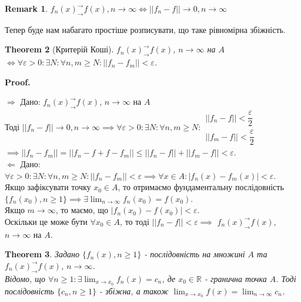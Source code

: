 \documentclass[a4paper, 10pt]{article}
\makeatletter
\def\huge{\displaystyle}
\def\qed{$\blacksquare$}
\def\rightproof{$\boxed{\Rightarrow}$ }
\def\leftproof{$\boxed{\Leftarrow}$ }
\theoremstyle{theoremdd}
\newtheorem{theorem}{Theorem}[subsection]
\theoremstyle{theoremdd}
\theoremstyle{theoremdd}
\theoremstyle{theoremdd}
\theoremstyle{theoremdd}
\theoremstyle{theoremdd}
\theoremstyle{theoremdd}
\newtheorem{remark}[theorem]{Remark}
\theoremstyle{theoremdd}
\theoremstyle{theoremdd}
\renewenvironment{proof}[1][Proof.\\]{\par
\pushQED{\hfill \qed}%
\normalfont \topsep6\p@\@plus6\p@\relax
\trivlist
\item\relax
{\bfseries
#1\@addpunct{.}}\hspace\labelsep\ignorespaces
}{%
\popQED\endtrivlist\@endpefalse
}
\makeatother
\begin{document}
\begin{remark}
$f_n(x)^\rightarrow_\rightarrow f(x), n \to \infty \iff ||f_n - f|| \to 0, n \to \infty$
\end{remark}
Тепер буде нам набагато простіше розписувати, що таке рівномірна збіжність.

\begin{theorem}[Критерій Коші]
$f_n(x)^\rightarrow_\rightarrow f(x)$, $n \to \infty$ на $A$ $\iff \forall \varepsilon > 0: \exists N: \forall n,m \geq N: ||f_n - f_m|| < \varepsilon$.
\end{theorem}

\begin{proof}
\rightproof Дано: $f_n(x)^\rightarrow_\rightarrow f(x)$, $n \to \infty$ на $A$\\
Тоді $||f_n - f|| \to 0, n \to \infty \implies \forall \varepsilon > 0: \exists N: \forall n,m \geq N: \begin{gathered} ||f_n-f|| < \dfrac{\varepsilon}{2} \\ ||f_m-f|| < \dfrac{\varepsilon}{2} \end{gathered}$\\
$\implies ||f_n - f_m|| = ||f_n - f + f - f_m|| \leq ||f_n - f|| + ||f_m - f|| < \varepsilon$.
\bigskip \\
\leftproof Дано: $\forall \varepsilon > 0: \exists N: \forall n,m \geq N: ||f_n - f_m|| < \varepsilon \implies \forall x \in A: |f_n(x) - f_m(x)| < \varepsilon$.\\
Якщо зафіксувати точку $x_0 \in A$, то отримаємо фундаментальну послідовність $\{f_n(x_0), n \geq 1\} \implies \exists \huge \lim_{n \to \infty} f_n(x_0) = f(x_0)$.\\
Якщо $m \to \infty$, то маємо, що $|f_n(x_0) - f(x_0)| < \varepsilon$.\\
Оскільки це може бути $\forall x_0 \in A$, то тоді $||f_n - f|| < \varepsilon \implies$ $f_n(x)^\rightarrow_\rightarrow f(x)$, $n \to \infty$ на $A$.
\end{proof}

\begin{theorem}
Задано $\{f_n(x), n \geq 1\}$ - послідовність на множині $A$ та $f_n(x)^\rightarrow_\rightarrow f(x)$, $n \to \infty$.\\
Відомо, що $\forall n \geq 1: \exists\huge\lim_{x \to x_0} f_n(x) = c_n$, де $x_0 \in \mathbb{R}$ - гранична точка $A$. Тоді послідовність $\{c_n, n \geq 1\}$ - збіжна, а також $\huge\lim_{x \to x_0} f(x) = \lim_{n \to \infty} c_n$.
\end{theorem}
\end{document}
